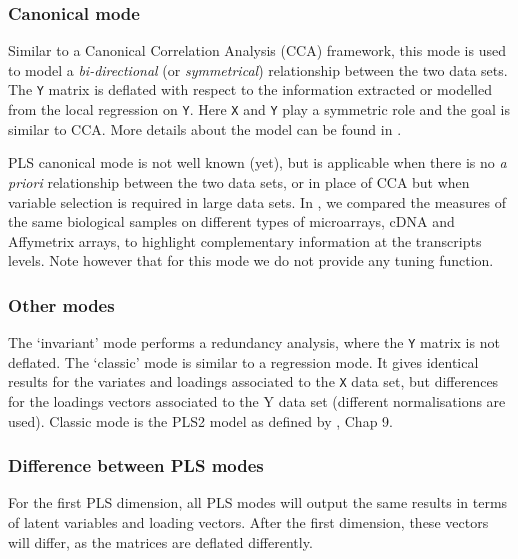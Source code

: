 \documentclass[]{book}
\begin{document}
\hypertarget{canonical-mode}{%
\subsubsection{Canonical mode}\label{canonical-mode}}

Similar to a Canonical Correlation Analysis (CCA) framework, this mode is used to model a \emph{bi-directional} (or \emph{symmetrical}) relationship between the two data sets. The \texttt{Y} matrix is deflated with respect to the information extracted or modelled from the local regression on \texttt{Y}. Here \texttt{X} and \texttt{Y} play a symmetric role and the goal is similar to CCA. More details about the model can be found in \citep{Lec09a}.

PLS canonical mode is not well known (yet), but is applicable when there is no \emph{a priori} relationship between the two data sets, or in place of CCA but when variable selection is required in large data sets. In \citep{Lec09a}, we compared the measures of the same biological samples on different types of microarrays, cDNA and Affymetrix arrays, to highlight complementary information at the transcripts levels. Note however that for this mode we do not provide any tuning function.

\hypertarget{other-modes}{%
\subsubsection{Other modes}\label{other-modes}}

The `invariant' mode performs a redundancy analysis, where the \texttt{Y} matrix is not deflated. The `classic' mode is similar to a regression mode. It gives identical results for the variates and loadings associated to the \texttt{X} data set, but differences for the loadings vectors associated to the Y data set (different normalisations are used). Classic mode is the PLS2 model as defined by \citep{Ten98}, Chap 9.

\hypertarget{difference-between-pls-modes}{%
\subsubsection{Difference between PLS modes}\label{difference-between-pls-modes}}

For the first PLS dimension, all PLS modes will output the same results in terms of latent variables and loading vectors. After the first dimension, these vectors will differ, as the matrices are deflated differently.
\end{document}
